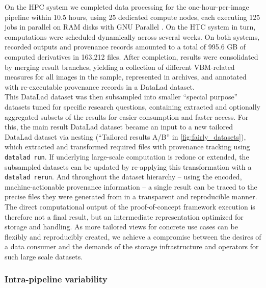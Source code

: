 On the \gls{HPC} system we completed data processing for the one-hour-per-image pipeline within 10.5 hours, using 25 dedicated compute nodes, each executing 125 jobs in parallel on RAM disks with GNU Parallel \citep{tange2011gnu}.
On the \gls{HTC} system in turn, computations were scheduled dynamically across several weeks.
On both systems, recorded outputs and provenance records amounted to a total of 995.6 GB of computed derivatives in 163,212 files.
After completion, results were consolidated by merging result branches, yielding a collection of different VBM-related measures for all images in the sample, represented in archives, and annotated with re-executable provenance records in a DataLad dataset.\\
This DataLad dataset was then subsampled into smaller ``special purpose'' datasets tuned for specific research questions, containing extracted and optionally aggregated subsets of the results for easier consumption and faster access.
For this, the main result DataLad dataset became an input to a new tailored DataLad dataset via nesting (``Tailored results A/B'' in \cref{fig:fairly_datasets}), which extracted and transformed required files with provenance tracking using \texttt{datalad run}.
If underlying large-scale computation is redone or extended, the subsampled datasets can be updated by re-applying this transformation with a \texttt{datalad rerun}.
And throughout the dataset hierarchy -- using the encoded, machine-actionable provenance information -- a single result can be traced to the precise files they were generated from in a transparent and reproducible manner.
The direct computational output of the proof-of-concept framework execution is therefore not a final result, but an intermediate representation optimized for storage and handling.
As more tailored views for concrete use cases can be flexibly and reproducibly created, we achieve a compromise between the desires of a data consumer and the demands of the storage infrastructure and operators for such large scale datasets.

\subsubsection{Intra-pipeline variability}

